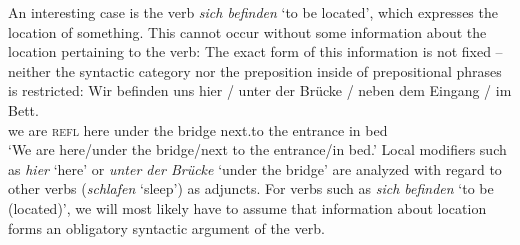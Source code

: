 An interesting case is the verb \emph{sich befinden} `to be located', which expresses the location of something. This cannot occur without
some information about the location pertaining to the verb:
\z
The exact form of this information is not fixed -- neither the syntactic category nor the
preposition inside of prepositional phrases is restricted:
\ea
\gll Wir befinden uns hier / unter der Brücke / neben dem Eingang / im Bett.\\
	 we are \textsc{refl} here {} under the bridge {} next.to the entrance {} in bed\\
\glt `We are here/under the bridge/next to the entrance/in bed.'
\z
Local modifiers such as \emph{hier} `here' or \emph{unter der Brücke} `under the bridge' are analyzed with regard to
other verbs (\eg \emph{schlafen} `sleep') as adjuncts. For verbs such as \emph{sich befinden} `to be (located)', we will most likely
have to assume that information about location forms an obligatory syntactic argument of the verb.
%
%

